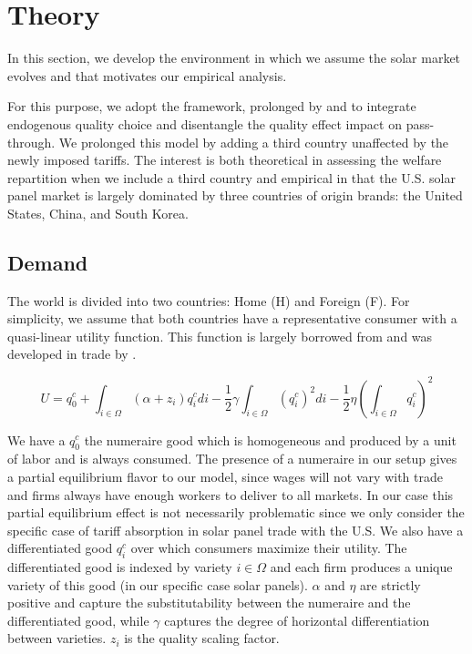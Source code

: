 \section{Theory} \label{sec:theory}

In this section, we develop the environment in which we assume the solar market evolves and that motivates our empirical analysis.

For this purpose, we adopt the \citet{melitzMarketSizeTrade2008} framework, prolonged by \citet{antoniadesHeterogeneousFirmsQuality2015} and \citet{ludemaTariffPassthroughFirm2016} to integrate endogenous quality choice and disentangle the quality effect impact on pass-through. We prolonged this model by adding a third country unaffected by the newly imposed tariffs. The interest is both theoretical in assessing the welfare repartition when we include a third country and empirical in that the U.S. solar panel market is largely dominated by three countries of origin brands: the United States, China, and South Korea.

\subsection{Demand}

The world is divided into two countries: Home (H) and Foreign (F). For simplicity, we assume that both countries have a representative consumer with a quasi-linear utility function. This function is largely borrowed from \citet{ludemaTariffPassthroughFirm2016} and was developed in trade by \cite{ottavianoAgglomerationTradeRevisited2002}.

\begin{equation} \label{eq:utility}
    U = q_0^c + \int_{i \in \Omega} (\alpha + z_i) q_i^c di - \frac{1}{2} \gamma \int_{i \in \Omega} (q_i^c)^2 di - \frac{1}{2} \eta \left(\int_{i \in \Omega} q_i^c \right)^2 
\end{equation}


We have a $q_0^c$ the numeraire good which is homogeneous and produced by a unit of labor and is always consumed. The presence of a numeraire in our setup gives a partial equilibrium flavor to our model, since wages will not vary with trade and firms always have enough workers to deliver to all markets. In our case this partial equilibrium effect is not necessarily problematic since we only consider the specific case of tariff absorption in solar panel trade with the U.S. We also have a differentiated good $q_i^c$ over which consumers maximize their utility. The differentiated good is indexed by variety $i \in \Omega$ and each firm produces a unique variety of this good (in our specific case solar panels). $\alpha$ and $\eta $ are strictly positive and capture the substitutability between the numeraire and the differentiated good, while $\gamma$ captures the degree of horizontal differentiation between varieties. $z_i$ is the quality scaling factor.

